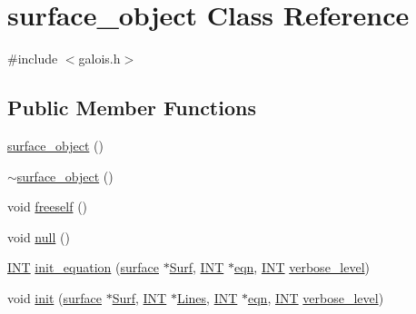 \hypertarget{classsurface__object}{}\section{surface\+\_\+object Class Reference}
\label{classsurface__object}


{\ttfamily \#include $<$galois.\+h$>$}

\subsection*{Public Member Functions}
\begin{DoxyCompactItemize}
\item 
\mbox{\hyperlink{classsurface__object_a73ac72eb094e7a6a72c3af701e2a4c6f}{surface\+\_\+object}} ()
\item 
\mbox{\hyperlink{classsurface__object_a880fa6d777c2bec7e7f01f1b667211c5}{$\sim$surface\+\_\+object}} ()
\item 
void \mbox{\hyperlink{classsurface__object_ada68e90aabf58a147af8daa60cf40e6a}{freeself}} ()
\item 
void \mbox{\hyperlink{classsurface__object_a8252a4bafc5b472c16387da74e1f9d0a}{null}} ()
\item 
\mbox{\hyperlink{galois_8h_a09fddde158a3a20bd2dcadb609de11dc}{I\+NT}} \mbox{\hyperlink{classsurface__object_afd4f4d1accbf361897374bd18d571913}{init\+\_\+equation}} (\mbox{\hyperlink{classsurface}{surface}} $\ast$\mbox{\hyperlink{classsurface__object_a23be3906bbf1ff7d8aab8a9b744595ba}{Surf}}, \mbox{\hyperlink{galois_8h_a09fddde158a3a20bd2dcadb609de11dc}{I\+NT}} $\ast$\mbox{\hyperlink{classsurface__object_a0fd2c77c27595731ee554e5b86a4b672}{eqn}}, \mbox{\hyperlink{galois_8h_a09fddde158a3a20bd2dcadb609de11dc}{I\+NT}} \mbox{\hyperlink{simeon_8_c_a818073fbcc2f439e7c56952f67386122}{verbose\+\_\+level}})
\item 
void \mbox{\hyperlink{classsurface__object_a078879fb001ac8384f2cc41d26049c81}{init}} (\mbox{\hyperlink{classsurface}{surface}} $\ast$\mbox{\hyperlink{classsurface__object_a23be3906bbf1ff7d8aab8a9b744595ba}{Surf}}, \mbox{\hyperlink{galois_8h_a09fddde158a3a20bd2dcadb609de11dc}{I\+NT}} $\ast$\mbox{\hyperlink{classsurface__object_a0fae2a45446843f691e91d58fb905afe}{Lines}}, \mbox{\hyperlink{galois_8h_a09fddde158a3a20bd2dcadb609de11dc}{I\+NT}} $\ast$\mbox{\hyperlink{classsurface__object_a0fd2c77c27595731ee554e5b86a4b672}{eqn}}, \mbox{\hyperlink{galois_8h_a09fddde158a3a20bd2dcadb609de11dc}{I\+NT}} \mbox{\hyperlink{simeon_8_c_a818073fbcc2f439e7c56952f67386122}{verbose\+\_\+level}})

\end{DoxyCompactItemize}
